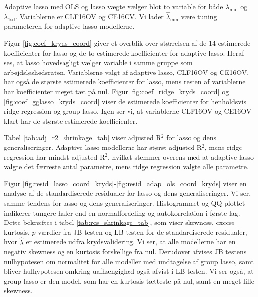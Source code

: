 Adaptive lasso med OLS og lasso vægte vælger blot to variable for både  $\lambda_{\min}$ og $\lambda_{1\text{sd}}$. 
Variablerne er  \textcolor{blue3}{CLF16OV} og \textcolor{blue3}{CE16OV}.
Vi lader $\widehat{\lambda}_{\min}$ være tuning parameteren for adaptive lasso modellerne. 

Figur \ref{fig:coef_kryds_coord} giver et overblik over størrelsen af de 14 estimerede koefficienter for lasso og de to estimerede koefficienter for adaptive lasso.
Heraf ses, at lasso hovedsagligt vælger variable i samme gruppe som arbejdsløshedsraten.
Variablerne valgt af adaptive lasso, \textcolor{blue3}{CLF16OV} og \textcolor{blue3}{CE16OV}, har også de største estimerede koefficienter for lasso, mens resten af variablerne har koefficienter meget tæt på nul. 
Figur \ref{fig:coef_ridge_kryds_coord} og \ref{fig:coef_gglasso_kryds_coord} viser de estimerede koefficienter for henholdsvis ridge regression og group lasso.
Igen ser vi, at variablerne \textcolor{blue3}{CLF16OV} og \textcolor{blue3}{CE16OV} klart har de største estimerede koefficienter.    
%


Tabel \ref{tab:adj_r2_shrinkage_tab} viser adjusted R$^2$ for lasso og dens generaliseringer.
Adaptive lasso modellerne har størst adjusted R$^2$, mens ridge regression har mindst adjusted R\(^2\), hvilket stemmer overens med at adaptive lasso valgte det færreste antal parametre, mens ridge regression valgte alle parametre. 


Figur \ref{fig:resid_lasso_coord_kryds}-\ref{fig:resid_adap_ols_coord_kryds} viser en analyse af de standardiserede residualer for lasso og dens generaliseringer. 
Vi ser, samme tendens for lasso og dens generaliseringer. Histogrammet og QQ-plottet indikerer tungere haler end en normalfordeling og autokorrelation i første lag.
Dette bekræftes i tabel \ref{tab:res_shrinkage_tab}, som viser skewness, excess kurtosis, $p$-værdier fra JB-testen og LB testen for de standardiserede residualer, hvor $\widehat{\lambda}$ er estimerede udfra krydsvalidering.  
Vi ser, at alle modellerne har en negativ skewness og en kurtosis forskellige fra nul. 
Derudover afvises JB testens nulhypotesen om normalitet for alle modeller med undtagelse af group lasso, samt bliver hulhypotesen omkring uafhængighed også afvist i LB testen. 
Vi ser også, at group lasso er den model, som har en kurtosis tætteste på nul, samt en meget lille skewness. 

